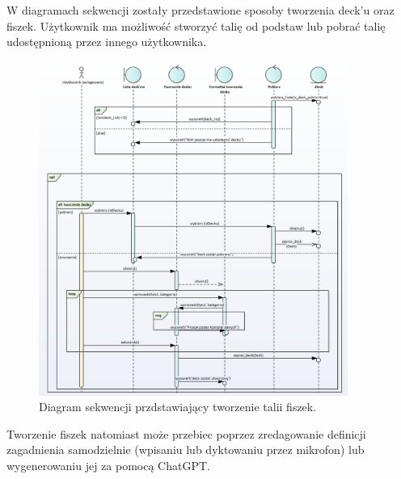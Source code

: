 \indent W diagramach sekwencji zostały przedstawione sposoby tworzenia deck’u oraz fiszek.
Użytkownik ma możliwość stworzyć talię od podstaw lub pobrać talię udostępnioną przez innego użytkownika.
\begin{figure}[H]
    \centering
    \includegraphics[width=0.9\textwidth]{chapters/chapter_6/diagram_sekwencji_1}
    \caption{Diagram sekwencji przdstawiający tworzenie talii fiszek.}
    \label{img:diagram_sekwencji_1}
\end{figure}

\newpage

\indent Tworzenie fiszek natomiast może przebiec poprzez zredagowanie definicji zagadnienia samodzielnie (wpisaniu lub dyktowaniu przez mikrofon) lub wygenerowaniu jej za pomocą ChatGPT.

